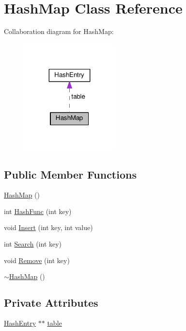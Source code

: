 \hypertarget{classHashMap}{}\section{Hash\+Map Class Reference}
\label{classHashMap}


Collaboration diagram for Hash\+Map\+:
\nopagebreak
\begin{figure}[H]
\begin{center}
\leavevmode
\includegraphics[width=143pt]{classHashMap__coll__graph}
\end{center}
\end{figure}
\subsection*{Public Member Functions}
\begin{DoxyCompactItemize}
\item 
\hyperlink{classHashMap_a3ae91705aa3ebfff22ce92e3c7797050}{Hash\+Map} ()
\item 
int \hyperlink{classHashMap_af676e8e12150e2f94ed7766103795f84}{Hash\+Func} (int key)
\item 
void \hyperlink{classHashMap_aa595b4e98a9ec68efa0ee9fe75126186}{Insert} (int key, int value)
\item 
int \hyperlink{classHashMap_a2801980039df1862de284ce00cb6d1f3}{Search} (int key)
\item 
void \hyperlink{classHashMap_a021573afbb91afef3b30e90d22aed366}{Remove} (int key)
\item 
\hyperlink{classHashMap_a7120321a936e8018fd276bcd4b4da3b8}{$\sim$\+Hash\+Map} ()
\end{DoxyCompactItemize}
\subsection*{Private Attributes}
\begin{DoxyCompactItemize}
\item 
\hyperlink{classHashEntry}{Hash\+Entry} $\ast$$\ast$ \hyperlink{classHashMap_a17f8fbff625a697ac94039b4a1c6cce4}{table}
\end{DoxyCompactItemize}


